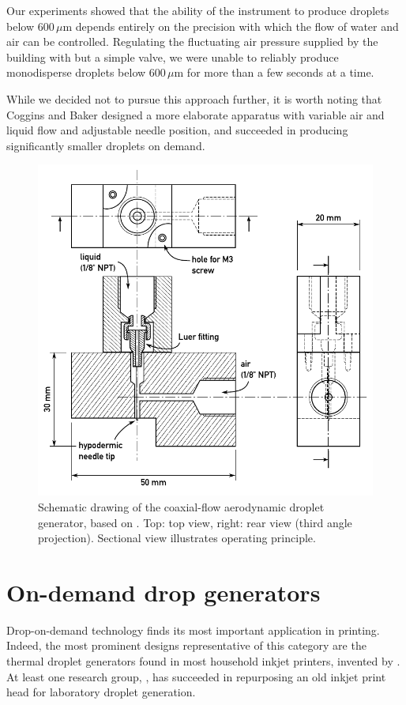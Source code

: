 \documentclass[11.5pt,oneside]{book}
\begin{document}
Our experiments showed that the ability of the
instrument to produce droplets below 600$\,\mu$m depends entirely on the
precision with which the flow of water and air can be controlled. Regulating the
fluctuating air pressure supplied by the building with but a simple valve, we
were unable to reliably produce monodisperse droplets below 600$\,\mu$m for more
than a few seconds at a time.

While we decided not to pursue this approach further, it is worth noting that Coggins and Baker
\cite{Coggins83} designed a more elaborate apparatus with variable air and liquid
flow and adjustable needle position, and succeeded in producing significantly
smaller droplets on demand.

\begin{figure}
\centering
\includegraphics[width=\textwidth]{img/setup/stry.pdf}
\caption{Schematic drawing of the coaxial-flow aerodynamic droplet generator,
based on \citet{Stry92}. Top: top view, right: rear view (third angle
projection). Sectional view illustrates operating principle.\label{fig:stry}}
\end{figure}

\section{On-demand drop generators}
Drop-on-demand technology finds its most important application in printing.
Indeed, the most prominent designs representative of this category are the thermal droplet
generators found in most household inkjet printers, invented by \citet{Endo88}.
At least one research group, \citet{Sergeyev06}, has succeeded in repurposing
an old inkjet print head for laboratory droplet generation.
\end{document}

